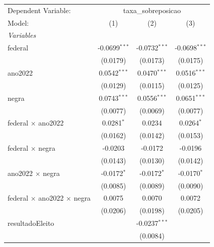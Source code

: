 
\begingroup
\centering
\begin{tabular}{lccc}
   \tabularnewline \midrule \midrule
   Dependent Variable: & \multicolumn{3}{c}{taxa\_sobreposicao}\\
   Model:                                    & (1)             & (2)             & (3)\\  
   \midrule
   \emph{Variables}\\
   federal                                   & -0.0699$^{***}$ & -0.0732$^{***}$ & -0.0698$^{***}$\\   
                                             & (0.0179)        & (0.0173)        & (0.0175)\\   
   ano2022                                   & 0.0542$^{***}$  & 0.0470$^{***}$  & 0.0516$^{***}$\\   
                                             & (0.0129)        & (0.0115)        & (0.0125)\\   
   negra                                     & 0.0743$^{***}$  & 0.0556$^{***}$  & 0.0651$^{***}$\\   
                                             & (0.0077)        & (0.0069)        & (0.0077)\\   
   federal $\times$ ano2022                  & 0.0281$^{*}$    & 0.0234          & 0.0264$^{*}$\\   
                                             & (0.0162)        & (0.0142)        & (0.0153)\\   
   federal $\times$ negra                    & -0.0203         & -0.0172         & -0.0196\\   
                                             & (0.0143)        & (0.0130)        & (0.0142)\\   
   ano2022 $\times$ negra                    & -0.0172$^{*}$   & -0.0172$^{*}$   & -0.0170$^{*}$\\   
                                             & (0.0085)        & (0.0089)        & (0.0090)\\   
   federal $\times$ ano2022 $\times$ negra   & 0.0075          & 0.0070          & 0.0072\\   
                                             & (0.0206)        & (0.0198)        & (0.0205)\\   
   resultadoEleito                           &                 & -0.0237$^{***}$ &   \\   
                                             &                 & (0.0084)        &   \\   

\end{tabular}
